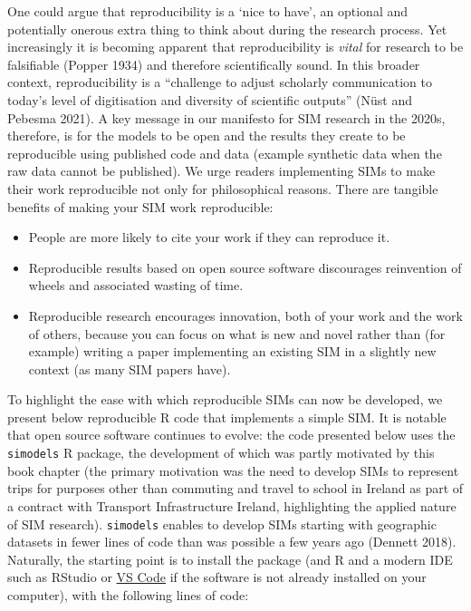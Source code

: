 \documentclass[11pt,letterpaper]{article}
\begin{document}
One could argue that reproducibility is a `nice to have', an optional and potentially onerous extra thing to think about during the research process.
Yet increasingly it is becoming apparent that reproducibility is \emph{vital} for research to be falsifiable (Popper 1934) and therefore scientifically sound.
In this broader context, reproducibility is a ``challenge to adjust scholarly communication to today's level of digitisation and diversity of scientific outputs'' (Nüst and Pebesma 2021).
A key message in our manifesto for SIM research in the 2020s, therefore, is for the models to be open and the results they create to be reproducible using published code and data (example synthetic data when the raw data cannot be published).
We urge readers implementing SIMs to make their work reproducible not only for philosophical reasons.
There are tangible benefits of making your SIM work reproducible:

\begin{itemize}
\item
  People are more likely to cite your work if they can reproduce it.
\item
  Reproducible results based on open source software discourages reinvention of wheels and associated wasting of time.
\item
  Reproducible research encourages innovation, both of your work and the work of others, because you can focus on what is new and novel rather than (for example) writing a paper implementing an existing SIM in a slightly new context (as many SIM papers have).
\end{itemize}

To highlight the ease with which reproducible SIMs can now be developed, we present below reproducible R code that implements a simple SIM.
It is notable that open source software continues to evolve: the code presented below uses the \texttt{simodels} R package, the development of which was partly motivated by this book chapter (the primary motivation was the need to develop SIMs to represent trips for purposes other than commuting and travel to school in Ireland as part of a contract with Transport Infrastructure Ireland, highlighting the applied nature of SIM research).
\texttt{simodels} enables to develop SIMs starting with geographic datasets in fewer lines of code than was possible a few years ago (Dennett 2018).
Naturally, the starting point is to install the package (and R and a modern IDE such as RStudio or \href{https://marketplace.visualstudio.com/items?itemName=REditorSupport.r}{VS Code} if the software is not already installed on your computer), with the following lines of code:
\end{document}
